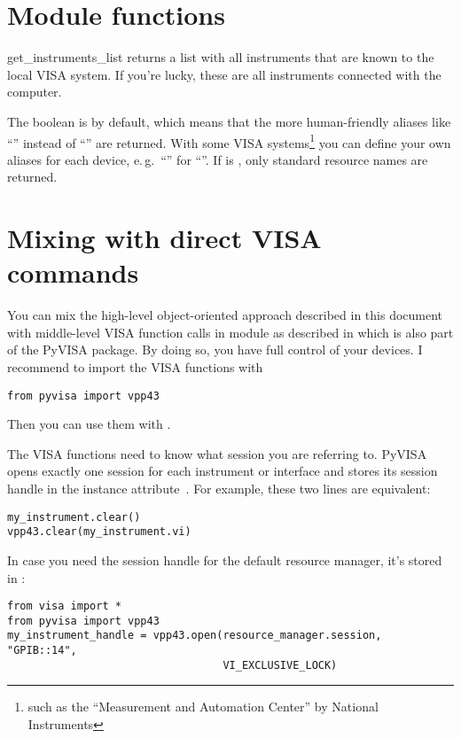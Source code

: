 \documentclass{howto}
\begin{document}
\section{Module functions}

\begin{funcdesc}{get_instruments_list}{}
  returns a list with all instruments that are known to the local VISA system.
  If you're lucky, these are all instruments connected with the computer.

  The boolean  is  by default, which means that the
  more human-friendly aliases like ``'' instead of ``''
  are returned.  With some VISA systems\footnote{such as the ``Measurement and
    Automation Center'' by National Instruments} you can define your own
  aliases for each device, e.\,g.\ ``'' for
  ``''.  If  is , only
  standard resource names are returned.
\end{funcdesc}


\section{Mixing with direct VISA commands}

You can mix the high-level object-oriented approach described in this document
with middle-level VISA function calls in module  as described in
 which is also part of the PyVISA package.  By doing so, you
have full control of your devices.  I recommend to import the VISA functions
with
\begin{verbatim}
from pyvisa import vpp43
\end{verbatim}
Then you can use them with .

The VISA functions need to know what session you are referring to.  PyVISA
opens exactly one session for each instrument or interface and stores its
session handle in the instance attribute~.  For example, these two
lines are equivalent:
\begin{verbatim}
my_instrument.clear()
vpp43.clear(my_instrument.vi)
\end{verbatim}

In case you need the session handle for the default resource manager, it's
stored in :
\begin{verbatim}
from visa import *
from pyvisa import vpp43
my_instrument_handle = vpp43.open(resource_manager.session, "GPIB::14",
                                  VI_EXCLUSIVE_LOCK)
\end{verbatim}
\end{document}
